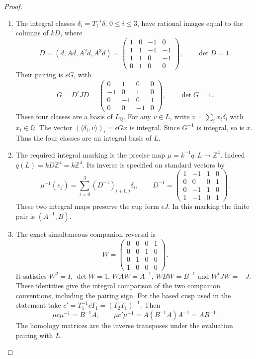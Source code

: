 \begin{proof}
\begin{enumerate}[label={$\langle1\rangle$\arabic*.}]
\item The integral classes
$\delta_i=T_1^{-i}\delta$, $0\leq i\leq3$, have rational images
equal to the columns of $kD$, where
\[
 D=(d,Ad,A^2d,A^3d)=
 \begin{pmatrix}1&0&-1&0\\1&1&-1&-1\\1&1&0&-1\\0&1&0&0\end{pmatrix},
 \qquad \det D=1.
\]
Their pairing is $\epsilon G$, with
\[
 G=D^tJD=
 \begin{pmatrix}0&1&0&0\\-1&0&1&0\\0&-1&0&1\\0&0&-1&0\end{pmatrix},
 \qquad \det G=1.
\]
These four classes are a basis of $L_{\mathbb Q}$. For any $v\in L$,
write $v=\sum_i x_i\delta_i$ with $x_i\in\mathbb Q$.
The vector $(\langle\delta_i,v\rangle)_i=\epsilon Gx$ is integral.
Since $G^{-1}$ is integral, so is $x$. Thus the four classes are an
integral basis of $L$.

\item The required integral marking is the precise map
$\mu=k^{-1}q:L\longrightarrow\mathbb Z^4$.
Indeed $q(L)=kD\mathbb Z^4=k\mathbb Z^4$. Its inverse is specified
on standard vectors by
\[
 \mu^{-1}(e_j)=\sum_{i=0}^3(D^{-1})_{i+1,j}\delta_i,
 \qquad
 D^{-1}=\begin{pmatrix}1&-1&1&0\\0&0&0&1\\0&-1&1&0\\1&-1&0&1\end{pmatrix}.
\]
These two integral maps preserve the cup form
$\epsilon J$. In this marking the finite pair is $(A^{-1},B)$.

\item The exact simultaneous companion reversal is
\[
 W=\begin{pmatrix}0&0&0&1\\0&0&1&0\\0&1&0&0\\1&0&0&0\end{pmatrix}.
\]
It satisfies $W^2=I$, $\det W=1$, $WAW=A^{-1}$,
$WBW=B^{-1}$ and $W^tJW=-J$. These identities give the integral comparison of the two companion conventions, including
the pairing sign. For the based cusp used in the statement take
$c'=T_1^{-1}cT_1=(T_2T_1)^{-1}$. Then
\[
 \mu c\mu^{-1}=B^{-1}A,\qquad
 \mu c'\mu^{-1}=A(B^{-1}A)A^{-1}=AB^{-1}.
\]
The homology matrices are the inverse transposes under the evaluation pairing with $L$.


\end{enumerate}
\end{proof}
